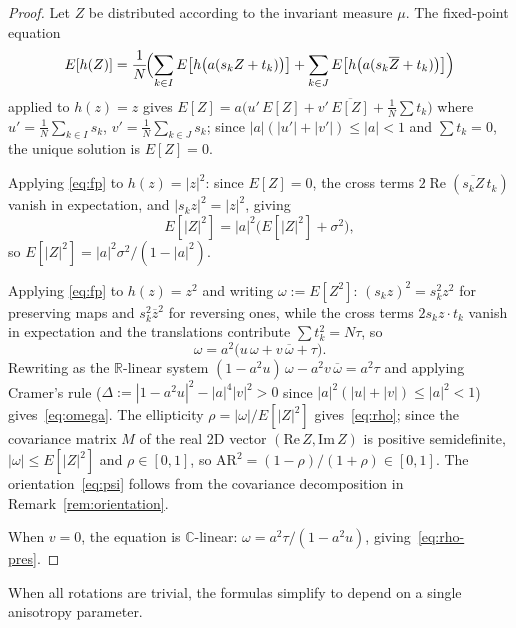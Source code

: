 \documentclass{amsart}
\theoremstyle{definition}
\theoremstyle{remark}
\begin{document}
\begin{proof}
Let $Z$ be distributed according to the invariant measure $\mu$.
The fixed-point equation
\begin{equation}\label{eq:fp}
  E[h(Z)] = \frac{1}{N}\!\Bigl(
    \sum_{k\in I} E\bigl[h\bigl(a(s_k Z + t_k)\bigr)\bigr]
    + \sum_{k\in J} E\bigl[h\bigl(a(s_k\overline{Z} + t_k)\bigr)\bigr]
  \Bigr)
\end{equation}
applied to $h(z)=z$ gives
$E[Z] = a\bigl(u'\,E[Z] + v'\,\overline{E[Z]}
  + \tfrac{1}{N}\!\sum t_k\bigr)$
where $u' = \frac{1}{N}\sum_{k\in I}s_k$,
$v' = \frac{1}{N}\sum_{k\in J}s_k$;
since $|a|(|u'|+|v'|)\leq|a|<1$ and $\sum t_k = 0$,
the unique solution is $E[Z]=0$.

Applying \eqref{eq:fp} to $h(z)=|z|^2$:
since $E[Z]=0$, the cross terms $2\operatorname{Re}(\overline{s_k Z}\,t_k)$
vanish in expectation, and $|s_k z|^2 = |z|^2$, giving
\[
  E[|Z|^2] = |a|^2\bigl(E[|Z|^2] + \sigma^2\bigr),
\]
so $E[|Z|^2] = |a|^2\sigma^2/(1-|a|^2)$.

Applying \eqref{eq:fp} to $h(z)=z^2$ and writing $\omega := E[Z^2]$:
$(s_k z)^2 = s_k^2 z^2$ for preserving maps and
$s_k^2\overline{z}^2$ for reversing ones, while the cross
terms $2s_k z\cdot t_k$ vanish in expectation
and the translations contribute $\sum t_k^2 = N\tau$, so
\begin{equation}\label{eq:omega-fp}
  \omega = a^2\bigl(u\,\omega + v\,\overline{\omega} + \tau\bigr).
\end{equation}
Rewriting as the $\mathbb{R}$-linear system
$(1-a^2 u)\,\omega - a^2 v\,\overline{\omega} = a^2\tau$
and applying Cramer's rule
($\Delta := |1-a^2 u|^2 - |a|^4|v|^2 > 0$
since $|a|^2(|u|+|v|)\leq |a|^2 < 1$)
gives~\eqref{eq:omega}.
The ellipticity
$\rho = |\omega|/E[|Z|^2]$ gives~\eqref{eq:rho};
since the covariance matrix $M$ of the real 2D vector
$(\mathrm{Re}\,Z,\mathrm{Im}\,Z)$ is positive semidefinite,
$|\omega|\leq E[|Z|^2]$ and $\rho\in[0,1]$, so
$\mathrm{AR}^2 = (1-\rho)/(1+\rho)\in[0,1]$.
The orientation~\eqref{eq:psi} follows from the
covariance decomposition in Remark~\ref{rem:orientation}.

When $v=0$, the equation is $\mathbb{C}$-linear:
$\omega = a^2\tau/(1-a^2 u)$,
giving~\eqref{eq:rho-pres}.
\end{proof}

When all rotations are trivial, the formulas simplify to depend
on a single anisotropy parameter.
\end{document}

